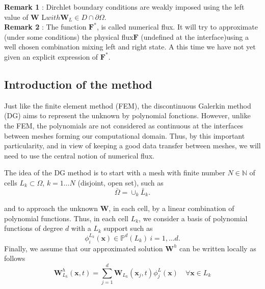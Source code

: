 \documentclass[a4paper,oneside,10pt]{report}
\begin{document}
\textbf{Remark 1} : Dirchlet boundary conditions are weakly imposed using the left value of $\mathbf{W}$ L$ with \mathbf{W}_L \in D \cap \partial \Omega$.\\
\newline
\textbf{Remark 2} :  The function $\mathbf{F}^*$,  is called numerical flux. It will try to approximate  (under some conditions) the physical flux$\mathbf{F}$ (undefined at the interface)using a well chosen combination mixing left and right state. A this time we have not yet given an explicit expression of  $\mathbf{F}^*$.


\subsection{Introduction of the method}
Just like the finite element method (FEM), the discontinuous Galerkin method (DG)  aims to represent the unknown  by polynomial fonctions. However, unlike the FEM, the polynomials are not considered as continuous at the interfaces between meshes forming our computational domain. Thus, by this important particularity, and in view of keeping a good data transfer between meshes, we will need to use the central notion of numerical flux.\newline

The idea of the DG method is to start with a mesh with finite number $N\in \mathbb{N}$ of cells $L_k \subset \Omega$, $k=1\dots N$ (disjoint, open set), such as
\begin{equation}
\bar{\Omega} = \cup_k \bar{L}_k.
\end{equation}

and to approach the unknown $\mathbf{W}$, in each cell, by a linear combination of polynomial functions. Thus, in each cell $L_k$, we consider a basis of polynomial functions of degree $d$ with a $L_k$ support such as
\begin{equation}
\phi^{L_k}_i(\mathbf{x}) \in \mathbb{P}^{d}(L_k)\ i=1,\dots d.
\end{equation}
Finally, we assume that our approximated solution $\mathbf{W}^h$ can be written locally as follows
\begin{equation}
\label{approx}
\mathbf{W}^h_{L_k}(\mathbf{x},t) = \sum\limits_{j=1}^d \mathbf{W}_{L_k}(\mathbf{x}_j,t) \phi_j^L (\mathbf{x}) \quad \forall \mathbf{x} \in L_k
\end{equation}
\end{document}
